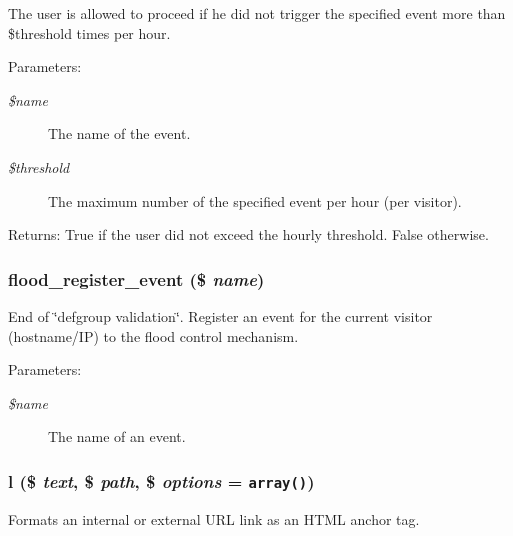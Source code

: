 The user is allowed to proceed if he did not trigger the specified event more than \$threshold times per hour.

\begin{Desc}
\item[Parameters:]
\begin{description}
\item[{\em \$name}]The name of the event. \item[{\em \$threshold}]The maximum number of the specified event per hour (per visitor). \end{description}
\end{Desc}
\begin{Desc}
\item[Returns:]True if the user did not exceed the hourly threshold. False otherwise. \end{Desc}
\hypertarget{common_8inc_368d89f553ff8bed006c18f801020778}{
\subsubsection[{flood\_\-register\_\-event}]{\setlength{\rightskip}{0pt plus 5cm}flood\_\-register\_\-event (\$ {\em name})}}
\label{common_8inc_368d89f553ff8bed006c18f801020778}


End of \char`\"{}defgroup validation\char`\"{}. Register an event for the current visitor (hostname/IP) to the flood control mechanism.

\begin{Desc}
\item[Parameters:]
\begin{description}
\item[{\em \$name}]The name of an event. \end{description}
\end{Desc}
\hypertarget{common_8inc_b1b47d5ab720066df684c335eda75cfd}{
\subsubsection[{l}]{\setlength{\rightskip}{0pt plus 5cm}l (\$ {\em text}, \/  \$ {\em path}, \/  \$ {\em options} = {\tt array()})}}
\label{common_8inc_b1b47d5ab720066df684c335eda75cfd}


Formats an internal or external URL link as an HTML anchor tag.

